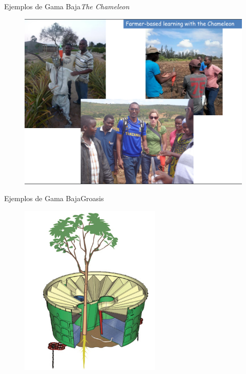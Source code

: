 \documentclass[]{beamer}
\begin{document}
\begin{frame}{Ejemplos de Gama Baja}{\emph{The Chameleon}}
  \begin{figure}
    \includegraphics[width=\textwidth]{Docs/chameleon4}
  \end{figure}
\end{frame}


\begin{frame}{Ejemplos de Gama Baja}{Groasis}
  \begin{figure}
    \includegraphics[width=0.6\textwidth]{Docs/groasis1}
  \end{figure}
\end{frame}
\end{document}

